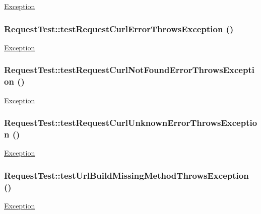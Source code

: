 \label{classRequestTest_a9ea34bc4bf4394c214013d651e819ef2}
\hyperlink{classException}{Exception} \hypertarget{classRequestTest_af908eba074694d3a67e8a7eeb41acd89}{
\subsubsection[{testRequestCurlErrorThrowsException}]{\setlength{\rightskip}{0pt plus 5cm}RequestTest::testRequestCurlErrorThrowsException ()}}
\label{classRequestTest_af908eba074694d3a67e8a7eeb41acd89}
\hyperlink{classException}{Exception} \hypertarget{classRequestTest_a89d8d17dd32d36a81927903c2315614a}{
\subsubsection[{testRequestCurlNotFoundErrorThrowsException}]{\setlength{\rightskip}{0pt plus 5cm}RequestTest::testRequestCurlNotFoundErrorThrowsException ()}}
\label{classRequestTest_a89d8d17dd32d36a81927903c2315614a}
\hyperlink{classException}{Exception} \hypertarget{classRequestTest_a46510f5d63d45a981fe05c34e569a7cb}{
\subsubsection[{testRequestCurlUnknownErrorThrowsException}]{\setlength{\rightskip}{0pt plus 5cm}RequestTest::testRequestCurlUnknownErrorThrowsException ()}}
\label{classRequestTest_a46510f5d63d45a981fe05c34e569a7cb}
\hyperlink{classException}{Exception} \hypertarget{classRequestTest_a02546fc31efd91f7073605417343ae48}{
\subsubsection[{testUrlBuildMissingMethodThrowsException}]{\setlength{\rightskip}{0pt plus 5cm}RequestTest::testUrlBuildMissingMethodThrowsException ()}}
\label{classRequestTest_a02546fc31efd91f7073605417343ae48}
\hyperlink{classException}{Exception} 

